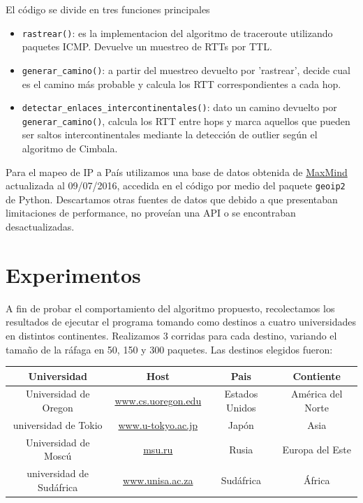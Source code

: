 El código se divide en tres funciones principales
\begin{itemize}
	\item{\texttt{rastrear()}: es la implementacion del algoritmo de traceroute utilizando paquetes ICMP. Devuelve un muestreo de RTTs por TTL.}
	\item{\texttt{generar\_camino()}: a partir del muestreo devuelto por 'rastrear', decide cual es el camino más probable y calcula los RTT correspondientes a cada hop.}
	\item{\texttt{detectar\_enlaces\_intercontinentales()}: dato un camino devuelto por \texttt{generar\_camino()}, calcula los RTT entre hops y marca aquellos que pueden ser saltos intercontinentales mediante la detección de outlier según el algoritmo de Cimbala.}
\end{itemize}	

Para el mapeo de IP a País utilizamos una base de datos obtenida de \href{http://www.maxmind.com}{MaxMind} actualizada al 09/07/2016, accedida en el código por medio del paquete \texttt{geoip2} de Python. Descartamos otras fuentes de datos que debido a que presentaban limitaciones de performance, no proveían una API o se encontraban desactualizadas. 


\section{Experimentos}
A fin de probar el comportamiento del algoritmo propuesto, recolectamos los resultados de ejecutar el programa tomando como destinos a cuatro universidades en distintos continentes. Realizamos 3 corridas para cada destino, variando el tamaño de la ráfaga en 50, 150 y 300 paquetes.
Las destinos elegidos fueron:

\begin{center}
   \begin{tabular}{ | c | c | c | c | }
     \hline
     \textbf{Universidad} & \textbf{Host} & \textbf{Pais} & \textbf{Contiente} \\ \hline
     Universidad de Oregon & \url{www.cs.uoregon.edu} & Estados Unidos & América del Norte\\ \hline
     universidad de Tokio & \url{www.u-tokyo.ac.jp} & Japón & Asia\\ \hline
     Universidad de Moscú & \url{msu.ru} & Rusia & Europa del Este\\ \hline
     universidad de Sudáfrica & \url{www.unisa.ac.za} & Sudáfrica & África \\ \hline
   \end{tabular}
 \end{center}
 

